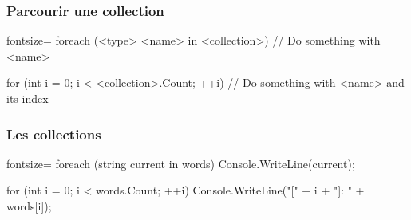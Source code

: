 \begin{frame}[fragile]
  \frametitle{Parcourir une collection}

  \begin{csharpcode*}{fontsize=\scriptsize}
    foreach (<type> <name> in <collection>)
    {
      // Do something with <name>
    }

    for (int i = 0; i < <collection>.Count; ++i)
    {
      // Do something with <name> and its index
    }
  \end{csharpcode*}
\end{frame}

\begin{frame}[fragile]
  \frametitle{Les collections}

  \begin{csharpcode*}{fontsize=\scriptsize}
    foreach (string current in words)
    {
      Console.WriteLine(current);
    }

    for (int i = 0; i < words.Count; ++i)
    {
      Console.WriteLine("[" + i + "]: " + words[i]);
    }
  \end{csharpcode*}
\end{frame}



